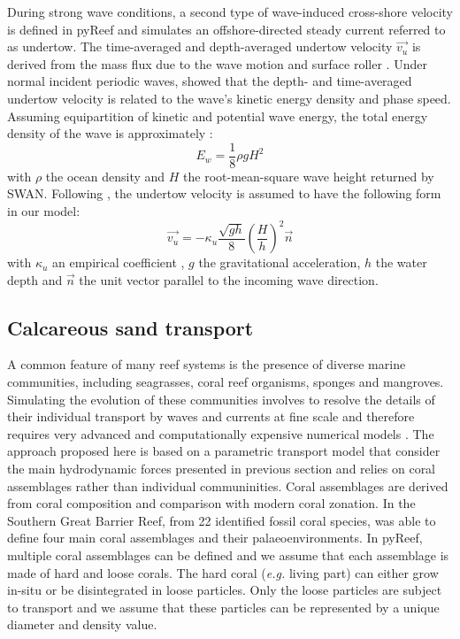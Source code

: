 \documentclass[default,jgrga]{agutex2015}
\begin{document}
\begin{article}
During strong wave conditions, a second type of wave-induced cross-shore velocity is defined in pyReef and simulates an offshore-directed steady current referred to as undertow. The time-averaged and depth-averaged undertow velocity $\vec{v_u}$ is derived from the mass flux due to the wave motion and surface roller \citep{Svendsen87}. Under normal incident periodic waves, \citet{Longuet-Higgins75} showed that the depth- and time-averaged undertow velocity is related to the wave's kinetic energy density and phase speed. Assuming  equipartition of kinetic and potential wave energy, the total energy density of the wave is approximately \citep{Svendsen84}:
\begin{equation}
E_w = \frac{1}{8} \rho g H^2
\end{equation}
with $\rho$ the ocean density and  $H$ the root-mean-square wave height returned by SWAN. Following \citet{Cox98}, the undertow velocity is assumed to have the following form in our model:
\begin{equation}
\vec{v_u} = - \kappa_u \frac{\sqrt{g h}}{8} \left(\frac{H}{h} \right)^2 \vec{n}
\end{equation}
with $\kappa_u$ an empirical coefficient \citep{Kobayashi98}, $g$ the gravitational acceleration, $h$ the water depth and $\vec{n}$ the unit vector parallel to the incoming wave direction.

\subsection{Calcareous sand transport}

A common feature of many reef systems is the presence of diverse marine communities, including seagrasses, coral reef organisms, sponges and mangroves. Simulating the evolution of these communities involves to resolve the details of their individual transport by waves and currents at fine scale and therefore requires very advanced and computationally expensive numerical models \citep{Lowe16}. The approach proposed here is based on a parametric transport model that consider the main hydrodynamic forces presented in previous section and  relies on coral assemblages rather than individual communinities. Coral assemblages are derived from coral composition and comparison with modern coral zonation. In the Southern Great Barrier Reef, from 22 identified fossil coral species, \citet{Dechnik15} was able to define four main coral assemblages and their palaeoenvironments. In pyReef, multiple coral assemblages can be defined and we assume that each assemblage is made of hard and loose corals. The hard coral (\textit{e.g.} living part) can either grow in-situ or be disintegrated in loose particles. Only the loose particles are subject to transport and we assume that these particles can be represented by a unique diameter and density value.


\end{article}
\end{document}
